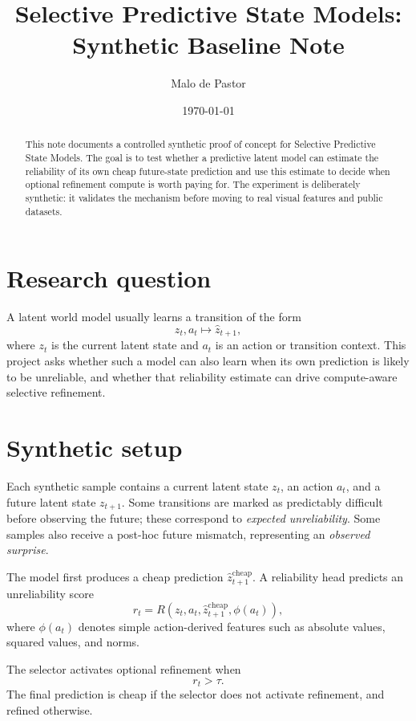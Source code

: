 \documentclass[10pt]{article}
\title{Selective Predictive State Models: Synthetic Baseline Note}
\author{Malo de Pastor}
\date{\today}
\begin{document}
\maketitle

\begin{abstract}
This note documents a controlled synthetic proof of concept for Selective Predictive State Models. The goal is to test whether a predictive latent model can estimate the reliability of its own cheap future-state prediction and use this estimate to decide when optional refinement compute is worth paying for. The experiment is deliberately synthetic: it validates the mechanism before moving to real visual features and public datasets.
\end{abstract}

\section{Research question}
A latent world model usually learns a transition of the form
\begin{equation}
    z_t, a_t \mapsto \hat z_{t+1},
\end{equation}
where \(z_t\) is the current latent state and \(a_t\) is an action or transition context. This project asks whether such a model can also learn when its own prediction is likely to be unreliable, and whether that reliability estimate can drive compute-aware selective refinement.

\section{Synthetic setup}
Each synthetic sample contains a current latent state \(z_t\), an action \(a_t\), and a future latent state \(z_{t+1}\). Some transitions are marked as predictably difficult before observing the future; these correspond to \emph{expected unreliability}. Some samples also receive a post-hoc future mismatch, representing an \emph{observed surprise}.

The model first produces a cheap prediction \(\hat z_{t+1}^{\mathrm{cheap}}\). A reliability head predicts an unreliability score
\begin{equation}
    r_t = R(z_t, a_t, \hat z_{t+1}^{\mathrm{cheap}}, \phi(a_t)),
\end{equation}
where \(\phi(a_t)\) denotes simple action-derived features such as absolute values, squared values, and norms.

The selector activates optional refinement when
\begin{equation}
    r_t > \tau.
\end{equation}
The final prediction is cheap if the selector does not activate refinement, and refined otherwise.
\end{document}

